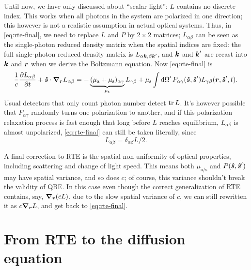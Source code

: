 \documentclass[hyperref, a4paper]{article}
\begin{document}
Until now, we have only discussed about ``scalar light'':
$L$ contains no discrete index.
This works when all photons in the system 
are polarized in one direction; 
this however is not a realistic assumption in actual optical systems.
Thus, in \eqref{eq:rte-final}, 
we need to replace $L$ and $P$ by $2 \times 2$ matrices;
$L_{\alpha \beta}$ can be seen as the single-photon reduced density matrix 
when the spatial indices are fixed:
the full single-photon reduced density matrix is 
$L_{\alpha \vb*{k}, \beta \vb*{k}'}$,
and $\vb*{k}$ and $\vb*{k}'$ are recast into $\vb*{k}$ and $\vb*{r}$ 
when we derive the Boltzmann equation.
Now \eqref{eq:rte-final} is 
\begin{equation}
    \frac{1}{c} \pdv{L_{\alpha \beta}}{t} + \vu*{s} \cdot \grad_{\vb*{r}} L_{\alpha \beta}
    = - \underbrace{(\mu_{\text{a}} + \mu_{\text{s}})_{\alpha \gamma}}_{\mu_{\text{t}}} L_{\gamma \beta} 
    + \mu_{\text{s}} \int \dd{\Omega'} 
    P_{\alpha \gamma}(\vu*{s}, \vu*{s}') L_{\gamma \beta}(\vb*{r}, \vu*{s}', t)  .
\end{equation} 
Usual detectors that only count photon number detect $\trace L$.
It's however possible that $P_{\alpha \gamma}$ randomly 
turns one polarization to another, 
and if this polarization relaxation process is fast enough 
that long before $L$ reaches equilibrium, 
$L_{\alpha \beta}$ is almost unpolarized,
\eqref{eq:rte-final} can still be taken literally, 
since 
\begin{equation}
    L_{\alpha \beta} = \delta_{\alpha \beta} L / 2.
\end{equation}

A final correction to RTE is the spatial non-uniformity of optical properties, 
including scattering and change of light speed. 
This means both $\mu_{\text{a/s}}$ and $P(\vu*{s}, \vu*{s}')$ 
may have spatial variance, 
and so does $c$; 
of course, this variance shouldn't break the validity of QBE. 
In this case even though the correct generalization of RTE contains, say, 
$\grad_{\vb*{r}} (c L)$, 
due to the slow spatial variance of $c$, 
we can still rewritten it as $c \grad_{\vb*{r}} L$, 
and get back to \eqref{eq:rte-final}.

\section{From RTE to the diffusion equation}
\end{document}

